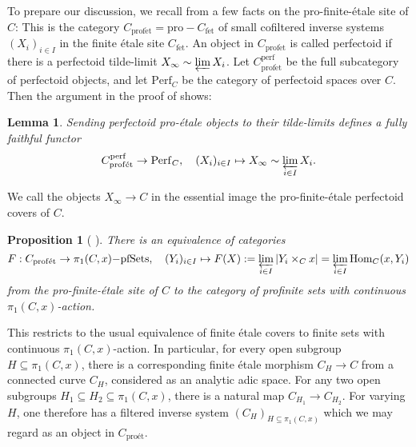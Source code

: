 \documentclass[10pt,oneside]{amsart}
\newtheorem{lemma}[theorem]{Lemma}
\newtheorem{proposition}[theorem]{Proposition}
\theoremstyle{definition}
\newcommand{\Hom}{\operatorname{Hom}}
\newcommand{\perf}{{\operatorname{perf}}}
\newcommand{\fet}{\operatorname{f\acute{e}t}}
\newcommand{\profet}{\operatorname{prof\acute{e}t}}
\begin{document}
	To prepare our discussion, we recall from \cite[\S3]{p-adic_Hodge} a few facts on the pro-finite-\'etale site of $C$: This is the category $C_{\profet}=\mathrm{pro-}C_{\fet}$ of small cofiltered inverse systems $(X_i)_{i\in I}$ in the finite \'etale site $C_{\fet}$. An object in $C_{\profet}$ is called perfectoid if there is a perfectoid tilde-limit $X_\infty\sim \varprojlim X_i$. Let $C_{\profet}^{\perf}$ be the full subcategory of perfectoid objects, and let $\mathrm{Perf}_C$ be the category of perfectoid spaces over $C$. Then the argument in the proof of \cite[Lemma 8.2.3]{berkeley} shows:
\begin{lemma}\label{l:profet-perf-tilde-limit-fully-faithful}
	Sending perfectoid pro-\'etale objects to their tilde-limits defines a fully faithful functor
	\[C_{\profet}^{\perf}\to  \mathrm{Perf}_{C},\quad (X_i)_{i\in I}\mapsto X_\infty\sim \varprojlim_{i\in I} X_i.\]
\end{lemma}
	We call the objects $X_\infty \to C$ in the essential image the pro-finite-\'etale perfectoid covers of $C$.
	\begin{proposition}[{ \cite[Proposition~3.5]{p-adic_Hodge}}]
		There is an equivalence of categories
		\[ F:C_{\mathrm{prof\acute{e}t}}\to \pi_{1}(C,x)\mathrm{-pfSets},\quad (Y_i)_{i\in I} \mapsto F(X):=\varprojlim_{i\in I}|Y_i\times_{C}x|=\varprojlim_{i\in I}\Hom_C(x,Y_i)\]
		from the pro-finite-\'etale site of $C$ to the category of profinite sets with continuous $\pi_{1}(C,x)$-action.
	\end{proposition}
	This restricts to the usual equivalence of finite \'etale covers to finite sets with continuous $\pi_{1}(C,x)$-action. 
	In particular, for every open subgroup $H\subseteq \pi_1(C,x)$, there is a corresponding finite \'etale morphism $C_H\to C$ from a connected curve $C_H$, considered as an analytic adic space. For any two open subgroups $H_1\subseteq H_2\subseteq \pi_1(C,x)$, there is a natural map $C_{H_1}\to C_{H_2}$. For varying $H$, one therefore has a filtered inverse system $(C_H)_{H\subseteq \pi_1(C,x)}$ which we may regard as an object in $C_{\text{pro\'et}}$.
\end{document}
